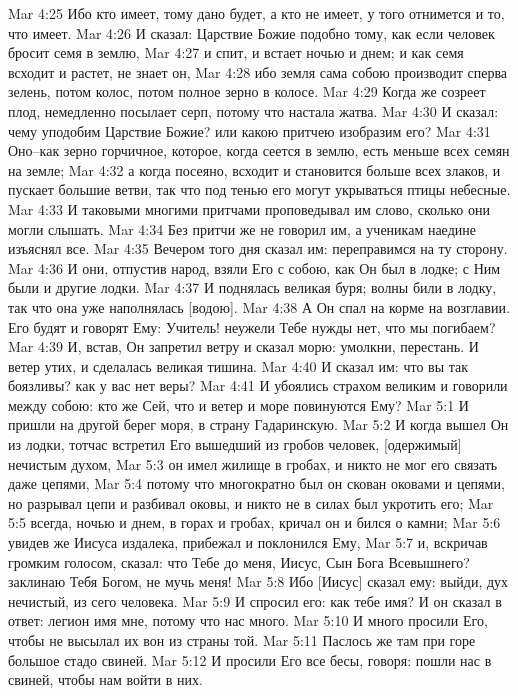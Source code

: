 Mar 4:25  Ибо кто имеет, тому дано будет, а кто не имеет, у того отнимется и то, что имеет.
Mar 4:26  И сказал: Царствие Божие подобно тому, как если человек бросит семя в землю,
Mar 4:27  и спит, и встает ночью и днем; и как семя всходит и растет, не знает он,
Mar 4:28  ибо земля сама собою производит сперва зелень, потом колос, потом полное зерно в колосе.
Mar 4:29  Когда же созреет плод, немедленно посылает серп, потому что настала жатва.
Mar 4:30  И сказал: чему уподобим Царствие Божие? или какою притчею изобразим его?
Mar 4:31  Оно--как зерно горчичное, которое, когда сеется в землю, есть меньше всех семян на земле;
Mar 4:32  а когда посеяно, всходит и становится больше всех злаков, и пускает большие ветви, так что под тенью его могут укрываться птицы небесные.
Mar 4:33  И таковыми многими притчами проповедывал им слово, сколько они могли слышать.
Mar 4:34  Без притчи же не говорил им, а ученикам наедине изъяснял все.
Mar 4:35  Вечером того дня сказал им: переправимся на ту сторону.
Mar 4:36  И они, отпустив народ, взяли Его с собою, как Он был в лодке; с Ним были и другие лодки.
Mar 4:37  И поднялась великая буря; волны били в лодку, так что она уже наполнялась [водою].
Mar 4:38  А Он спал на корме на возглавии. Его будят и говорят Ему: Учитель! неужели Тебе нужды нет, что мы погибаем?
Mar 4:39  И, встав, Он запретил ветру и сказал морю: умолкни, перестань. И ветер утих, и сделалась великая тишина.
Mar 4:40  И сказал им: что вы так боязливы? как у вас нет веры?
Mar 4:41  И убоялись страхом великим и говорили между собою: кто же Сей, что и ветер и море повинуются Ему?
Mar 5:1  И пришли на другой берег моря, в страну Гадаринскую.
Mar 5:2  И когда вышел Он из лодки, тотчас встретил Его вышедший из гробов человек, [одержимый] нечистым духом,
Mar 5:3  он имел жилище в гробах, и никто не мог его связать даже цепями,
Mar 5:4  потому что многократно был он скован оковами и цепями, но разрывал цепи и разбивал оковы, и никто не в силах был укротить его;
Mar 5:5  всегда, ночью и днем, в горах и гробах, кричал он и бился о камни;
Mar 5:6  увидев же Иисуса издалека, прибежал и поклонился Ему,
Mar 5:7  и, вскричав громким голосом, сказал: что Тебе до меня, Иисус, Сын Бога Всевышнего? заклинаю Тебя Богом, не мучь меня!
Mar 5:8  Ибо [Иисус] сказал ему: выйди, дух нечистый, из сего человека.
Mar 5:9  И спросил его: как тебе имя? И он сказал в ответ: легион имя мне, потому что нас много.
Mar 5:10  И много просили Его, чтобы не высылал их вон из страны той.
Mar 5:11  Паслось же там при горе большое стадо свиней.
Mar 5:12  И просили Его все бесы, говоря: пошли нас в свиней, чтобы нам войти в них.
